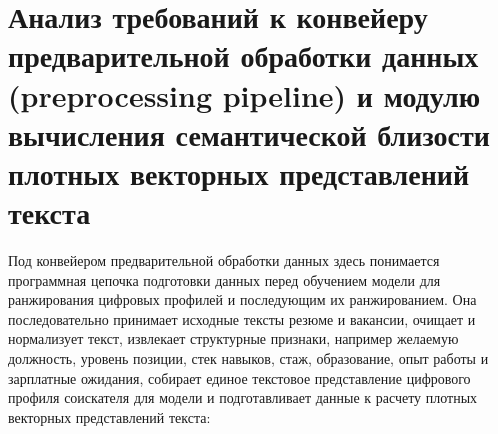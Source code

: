 \section{Анализ требований к конвейеру предварительной обработки данных (preprocessing pipeline) и модулю вычисления семантической близости плотных векторных представлений текста}
Под конвейером предварительной обработки данных здесь понимается программная цепочка подготовки данных перед обучением модели для ранжирования цифровых профилей и последующим их ранжированием. Она последовательно принимает исходные тексты резюме и вакансии, очищает и нормализует текст, извлекает структурные признаки, например желаемую должность, уровень позиции, стек навыков, стаж, образование, опыт работы и зарплатные ожидания, собирает единое текстовое представление цифрового профиля соискателя для модели и подготавливает данные к расчету плотных векторных представлений текста:\par
